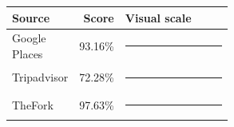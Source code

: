 {\small
\begin{tabular}{lrp{0.55\linewidth}}
\toprule
Source & Score & Visual scale \\
\midrule
Google Places & 93.16\% & \textcolor{qualityblue}{\rule{65.2mm}{5pt}} \\
Tripadvisor & 72.28\% & \textcolor{qualityblue}{\rule{50.6mm}{5pt}} \\
TheFork & 97.63\% & \textcolor{qualityblue}{\rule{68.3mm}{5pt}} \\
\bottomrule
\end{tabular}
}
